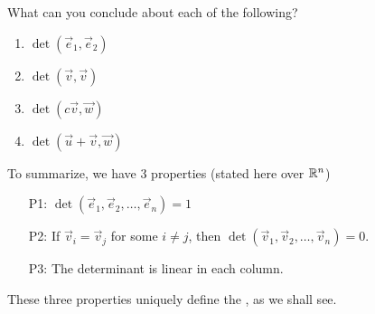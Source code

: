 \begin{applicationActivities}{1}{25}
\begin{activity}{10}
\begin{minipage}{0.8\textwidth}
\begin{multicols}{2}
\begin{center}
\end{center}

\begin{center}
\end{center}

\end{multicols}
\end{minipage}

\end{activity}

\begin{activity}{10}
What can you conclude about each of the following?
\begin{enumerate}
\item $\det(\vec{e}_1,\vec{e}_2)$
\item $\det(\vec{v},\vec{v})$
\item $\det(c\vec{v},\vec{w})$
\item $\det(\vec{u}+\vec{v},\vec{w})$
\end{enumerate}
\end{activity}


\begin{definition}
To summarize, we have 3 properties (stated here over $\mathbb{R}^n$)
\begin{enumerate}
\item [P1:] $\det(\vec{e}_1,\vec{e}_2,\ldots,\vec{e}_n)=1$
\item [P2:] If $\vec{v}_i = \vec{v}_j$ for some $i \neq j$, then $\det(\vec{v}_1,\vec{v}_2,\ldots,\vec{v}_n)=0$.
\item[P3:] The determinant is linear in each column.
\end{enumerate}

These three properties uniquely define the , as we shall see.
\end{definition}


\end{applicationActivities}
